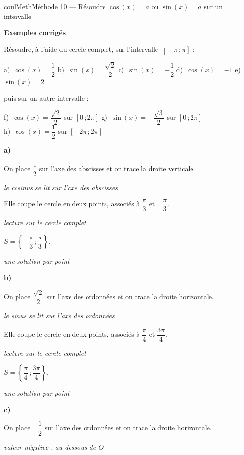 \documentclass[11pt,a4paper]{article}
\makeatletter
\newcommand{\lycee@intff}[2]{\left[#1\,;#2\right]}
\newcommand{\lycee@intof}[2]{\left]#1\,;#2\right]}
\newcommand{\lycee@ens}[1]{\left\{#1\right\}}
\providecommand{\intff}{\lycee@intff}%
\providecommand{\intof}{\lycee@intof}%
\providecommand{\ens}{\lycee@ens}}
\newcounter{lycee@signet}
\newcommand{\signet}[3][]{\stepcounter{lycee@signet}%
  \edef\lycee@dest{\if\relax\detokenize{#1}\relax
    signet.\arabic{lycee@signet}\else#1\fi}%
  \hypertarget{\lycee@dest}{}\bookmark[level=#2,dest=\lycee@dest]{#3}}
\newcommand{\res}[1]{#1}
\newcounter{methode}
\newenvironment{methodebox}[1][Méthode]{\stepcounter{methode}%
  \begin{boitecours}[phantom={\signet[methode-\arabic{methode}]{2}{#1}}]{coulMeth}{#1}}%
  {\end{boitecours}}
\newcommand{\etape}[1]{\par\smallskip\textbf{\color{coulMeth}#1}\par\nobreak\smallskip}
\newcommand{\explique}[2]{\par\smallskip\noindent
  \begin{minipage}[t]{0.57\linewidth}\raggedright #1\end{minipage}\hfill
  \begin{minipage}[t]{0.40\linewidth}\raggedright\leavevmode
    {\small\itshape\color{black!60}#2}\end{minipage}\par}
\newcommand{\cas}[1]{\par\smallskip\noindent\textbf{\color{coulExo}#1}\vadjust{\nobreak}}
\newenvironment{correction}{\par}{\par}
\newcommand{\etapeexemples}{\etape{Exemples corrigés}}
\makeatother
\begin{document}
\begin{methodebox}[Méthode 10 --- Résoudre $\cos(x)=a$ ou $\sin(x)=a$ sur un intervalle]
\etapeexemples
Résoudre, à l'aide du cercle complet, sur l'intervalle $\intof{-\pi}{\pi}$ :
\begin{center}
a)~$\cos(x)=\dfrac{1}{2}$ \qquad b)~$\sin(x)=\dfrac{\sqrt{2}}{2}$ \qquad
c)~$\sin(x)=-\dfrac{1}{2}$ \qquad d)~$\cos(x)=-1$ \qquad e)~$\sin(x)=2$
\end{center}
puis sur un autre intervalle :
\begin{center}
f)~$\cos(x)=\dfrac{\sqrt{2}}{2}$ sur $\intff{0}{2\pi}$ \qquad
g)~$\sin(x)=-\dfrac{\sqrt{3}}{2}$ sur $\intff{0}{2\pi}$\\[4pt]
h)~$\cos(x)=\dfrac{1}{2}$ sur $\intff{-2\pi}{2\pi}$
\end{center}
\begin{correction}
\cas{a)}\par\nopagebreak
\begin{minipage}[c]{0.68\linewidth}\raggedright
\explique{On place $\dfrac{1}{2}$ sur l'axe des abscisses et on trace la droite verticale.}{le cosinus se lit sur l'axe des abscisses}
\explique{Elle coupe le cercle en deux points, associés à $\dfrac{\pi}{3}$ et $-\dfrac{\pi}{3}$.}{lecture sur le cercle complet}
\explique{$S=\res{\ens{-\dfrac{\pi}{3}\,;\dfrac{\pi}{3}}}$.}{une solution par point}
\end{minipage}\hfill
\begin{minipage}[c]{0.28\linewidth}\centering
{}
\end{minipage}
\cas{b)}\par\nopagebreak
\begin{minipage}[c]{0.68\linewidth}\raggedright
\explique{On place $\dfrac{\sqrt{2}}{2}$ sur l'axe des ordonnées et on trace la droite horizontale.}{le sinus se lit sur l'axe des ordonnées}
\explique{Elle coupe le cercle en deux points, associés à $\dfrac{\pi}{4}$ et $\dfrac{3\pi}{4}$.}{lecture sur le cercle complet}
\explique{$S=\res{\ens{\dfrac{\pi}{4}\,;\dfrac{3\pi}{4}}}$.}{une solution par point}
\end{minipage}\hfill
\begin{minipage}[c]{0.28\linewidth}\centering
{}
\end{minipage}
\cas{c)}\par\nopagebreak
\begin{minipage}[c]{0.68\linewidth}\raggedright
\explique{On place $-\dfrac{1}{2}$ sur l'axe des ordonnées et on trace la droite horizontale.}{valeur négative : au-dessous de $O$}

\end{minipage}
\end{correction}
\end{methodebox}
\end{document}
